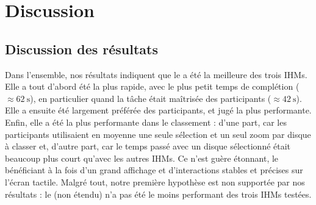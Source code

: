 \chapter{Discussion}
\label{ch:discussion}

\section{Discussion des résultats}
\label{sec:discussion_results}

Dans l'ensemble, nos résultats indiquent que le  a été la meilleure des trois IHMs. Elle a tout d'abord été la plus rapide, avec le plus petit temps de complétion ($\approx \SI{62}{\s}$), en particulier quand la tâche était maîtrisée des participants ($\approx \SI{42}{\s}$). Elle a ensuite été largement préférée des participants, et jugé la plus performante. Enfin, elle a été la plus performante dans le classement : d'une part, car les participants utilisaient en moyenne une seule sélection et un seul zoom par disque à classer et, d'autre part, car le temps passé avec un disque sélectionné était beaucoup plus court qu'avec les autres IHMs. Ce n'est guère étonnant, le  bénéficiant à la fois d'un grand affichage et d'interactions stables et précises sur l'écran tactile. Malgré tout, notre première hypothèse est non supportée par nos résultats : le  (non étendu) n'a pas été le moins performant des trois IHMs testées.


